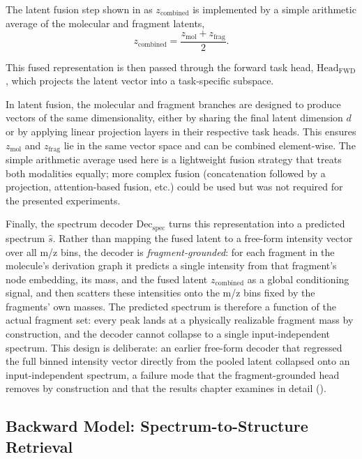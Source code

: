 The latent fusion step shown in  as $z_{\mathrm{combined}}$ is implemented by a simple arithmetic average of the molecular and fragment latents,
\begin{equation}
    \label{eq:arithmetic_fusion}
    z_{\mathrm{combined}} = \frac{z_{\mathrm{mol}} + z_{\mathrm{frag}}}{2}.
\end{equation}

This fused representation is then passed through the forward task head, \texttt{$\text{Head}_{\mathrm{FWD}}$}, which projects the latent vector into a task-specific subspace.

In latent fusion, the molecular and fragment branches are designed to produce vectors of the same dimensionality, either by sharing the final latent dimension $d$ or by applying linear projection layers in their respective task heads.
This ensures $z_{\mathrm{mol}}$ and $z_{\mathrm{frag}}$ lie in the same vector space and can be combined element-wise.
The simple arithmetic average used here  is a lightweight fusion strategy that treats both modalities equally; more complex fusion (concatenation followed by a projection, attention-based fusion, etc.) could be used but was not required for the presented experiments.

Finally, the spectrum decoder $\mathrm{Dec}_{\mathrm{spec}}$ turns this representation into a predicted spectrum $\hat{s}$.
Rather than mapping the fused latent to a free-form intensity vector over all m/z bins, the decoder is \emph{fragment-grounded}: for each fragment in the molecule's derivation graph it predicts a single intensity from that fragment's node embedding, its mass, and the fused latent $z_{\mathrm{combined}}$ as a global conditioning signal, and then scatters these intensities onto the m/z bins fixed by the fragments' own masses.
The predicted spectrum is therefore a function of the actual fragment set: every peak lands at a physically realizable fragment mass by construction, and the decoder cannot collapse to a single input-independent spectrum.
This design is deliberate: an earlier free-form decoder that regressed the full binned intensity vector directly from the pooled latent collapsed onto an input-independent spectrum, a failure mode that the fragment-grounded head removes by construction and that the results chapter examines in detail ().

\subsection{Backward Model: Spectrum-to-Structure Retrieval}

